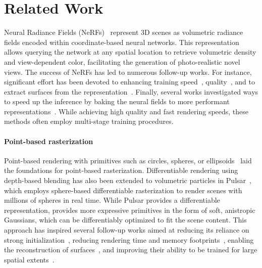 \section{Related Work}
\label{sec:related}
% 
Neural Radiance Fields (NeRFs)~\cite{nerf} represent 3D scenes as volumetric radiance fields encoded within coordinate-based neural networks. 
This representation allows querying the network at any spatial location to retrieve volumetric density and view-dependent color, facilitating the generation of photo-realistic novel views.
The success of NeRFs has led to numerous follow-up works. 
For instance, significant effort has been devoted to enhancing training speed~\cite{ingp, kilonerf}, quality~\cite{mipnerf, mipnerf360}, and to extract surfaces from the representation~\cite{neus, volsdf}.
Finally, several works investigated ways to speed up the inference by baking the neural fields to more performant representations~\cite{mobilenerf, quadfields, smerf, adaptive-shells, binary-opacity-grids}.
While achieving high quality and fast rendering speeds, these methods often employ multi-stage training procedures.

\paragraph{Point-based rasterization}
Point-based rendering with primitives such as circles, spheres, or ellipsoids~\cite{surface-splatting, surfels, object-ewa} laid the foundations for point-based rasterization.
Differentiable rendering using depth-based blending has also been extended to volumetric particles in Pulsar~\cite{pulsar}, which employs sphere-based differentiable rasterization to render scenes with millions of spheres in real time.
While Pulsar provides a differentiable representation, \citet{gsplat} provides more expressive primitives in the form of soft, anistropic Gaussians, which can be differentiably optimized to fit the scene content.
This approach has inspired several follow-up works aimed at reducing its reliance on strong initialization~\cite{3dgs-mcmc}, reducing rendering time and memory footprints~\cite{light-3dgs, compressed-3dgs, reducing-mem-3dgs}, enabling the reconstruction of surfaces~\cite{sugar, 2dsplat}, and improving their ability to be trained for large spatial extents~\cite{octree-gs, hierarchicalgaussians}.

